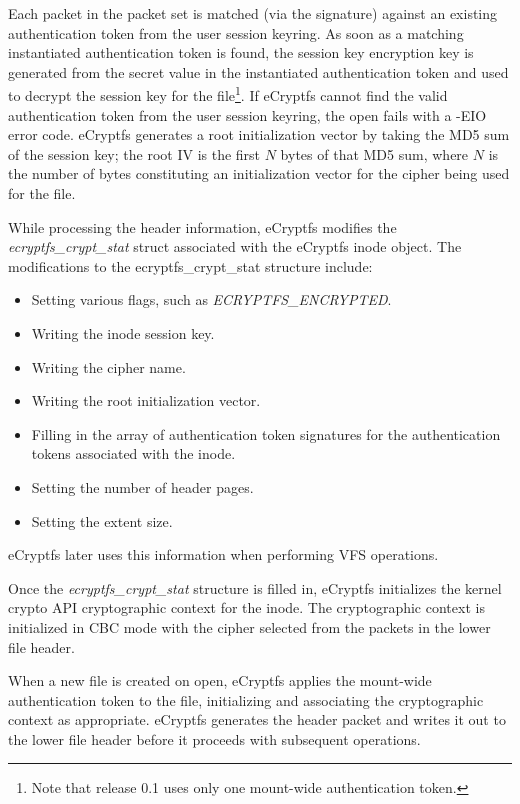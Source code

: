 \documentclass{article}
\begin{document}
Each packet in the packet set is matched (via the signature) against
an existing authentication token from the user session keyring. As
soon as a matching instantiated authentication token is found, the
session key encryption key is generated from the secret value in the
instantiated authentication token and used to decrypt the session key
for the file\footnote{Note that release 0.1 uses only one mount-wide
authentication token.}. If eCryptfs cannot find the valid
authentication token from the user session keyring, the open fails
with a -EIO error code. eCryptfs generates a root initialization
vector by taking the MD5 sum of the session key; the root IV is the
first $N$ bytes of that MD5 sum, where $N$ is the number of bytes
constituting an initialization vector for the cipher being used for
the file.

While processing the header information, eCryptfs modifies the
\emph{ecryptfs\_crypt\_stat} struct associated with the eCryptfs inode
object.
The modifications to the ecryptfs\_crypt\_stat structure include:

\begin{itemize}
\item{Setting various flags, such as \emph{ECRYPTFS\_ENCRYPTED}.}
\item{Writing the inode session key.}
\item{Writing the cipher name.}
\item{Writing the root initialization vector.}
\item{Filling in the array of authentication token signatures for the
  authentication tokens associated with the inode.}
\item{Setting the number of header pages.}
\item{Setting the extent size.}
\end{itemize}

eCryptfs later uses this information when performing VFS operations.

Once the \emph{ecryptfs\_crypt\_stat} structure is filled in, eCryptfs
initializes the kernel crypto API cryptographic context for the inode.
The cryptographic context is initialized in CBC mode with the cipher
selected from the packets in the lower file header.

When a new file is created on open, eCryptfs applies the mount-wide
authentication token to the file, initializing and associating the
cryptographic context as appropriate. eCryptfs generates the header
packet and writes it out to the lower file header before it proceeds
with subsequent operations.
\end{document}
